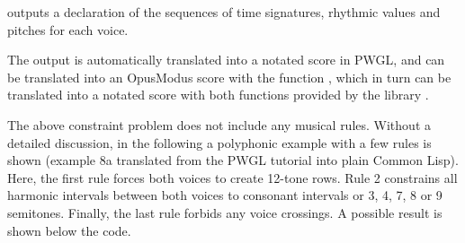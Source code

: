 \documentclass[letterpaper,10pt,english]{sphinxmanual}
\begin{document}
 outputs a declaration of the sequences of time signatures, rhythmic values and pitches for each voice.

\begin{sphinxVerbatim}[commandchars=\\\{\}]
     
          
  
          
   
      
\end{sphinxVerbatim}

The output is automatically translated into a notated score in PWGL, and can be translated into an OpusModus score with the function , which in turn can be translated into a notated score with  \textendash{} both functions provided by the library .

\begin{sphinxVerbatim}[commandchars=\\\{\}]
               
\end{sphinxVerbatim}

The above constraint problem does not include any musical rules. Without a detailed discussion, in the following a polyphonic example with a few rules is shown (example 8a translated from the PWGL tutorial into plain Common Lisp). Here, the first rule forces both voices to create 12-tone rows. Rule 2 constrains all harmonic intervals between both voices to consonant intervals or 3, 4, 7, 8 or 9 semitones. Finally, the last rule forbids any voice crossings. A possible result is shown below the code.
\end{document}
